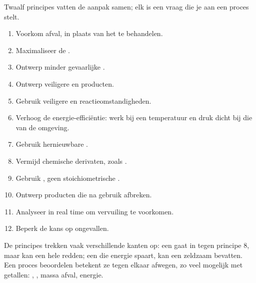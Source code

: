 Twaalf principes vatten de aanpak samen; elk is een vraag die je aan een
proces stelt.
\begin{enumerate}
  \item Voorkom afval, in plaats van het te behandelen.
  \item Maximaliseer de .
  \item Ontwerp minder gevaarlijke .
  \item Ontwerp veiligere  en producten.
  \item Gebruik veiligere  en reactieomstandigheden.
  \item Verhoog de energie-efficiëntie: werk bij een temperatuur en druk
        dicht bij die van de omgeving.
  \item Gebruik hernieuwbare .
  \item Vermijd chemische derivaten, zoals .
  \item Gebruik , geen stoichiometrische .
  \item Ontwerp producten die na gebruik afbreken.
  \item Analyseer in real time om vervuiling te voorkomen.
  \item Beperk de kans op ongevallen.
\end{enumerate}

\begin{remark}\label{rem:g12:synthesis-strategy:principles}
De principes trekken vaak verschillende kanten op: een 
gaat in tegen principe 8, maar kan een hele  redden; een
 die energie spaart, kan een zeldzaam  bevatten. Een
proces beoordelen betekent ze tegen elkaar afwegen, zo veel mogelijk met
getallen: , , massa afval, energie.
\end{remark}

